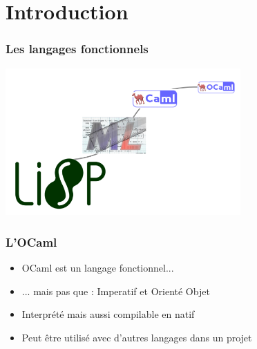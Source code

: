 \section*{Introduction}
\begin{frame}
	\frametitle{Les langages fonctionnels}
	\includegraphics[width=9cm]{pics/history.png}
\end{frame}

\begin{frame}
	\frametitle{L'OCaml}
	\begin{itemize}
		\item OCaml est un langage fonctionnel...
		\item ... mais pas que : Imperatif et Orienté Objet
		\item Interprété mais aussi compilable en natif
		\item Peut être utilisé avec d'autres langages dans un projet
	\end{itemize}
\end{frame}
